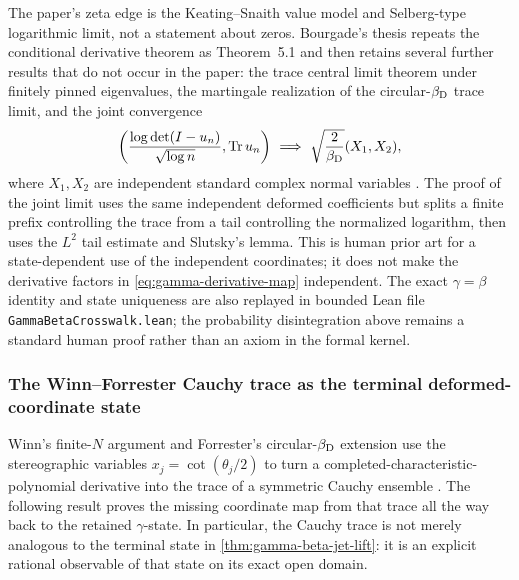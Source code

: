 \begin{sloppypar}
The paper's zeta edge is the Keating--Snaith value model and Selberg-type logarithmic
limit, not a statement about zeros.  Bourgade's thesis repeats the conditional derivative
theorem as Theorem~5.1 and then retains several further results that do not occur in the
paper: the trace central limit theorem under finitely pinned eigenvalues, the martingale
realization of the circular-$\beta_{\rm D}$ trace limit, and the joint convergence
\begin{equation}
 \left(\frac{\log\det(I-u_n)}{\sqrt{\log n}},\operatorname{Tr}u_n\right)
 \ \Longrightarrow\
 \sqrt{\frac{2}{\beta_{\rm D}}}(X_1,X_2),
 \label{eq:bourgade-thesis-logdet-trace}
\end{equation}
where $X_1,X_2$ are independent standard complex normal variables
\cite[Chap.~5, Thms.~5.1, 5.11, 5.14 and Cor.~5.13]{bourgadeThesis2010}.
The proof of the joint limit uses the same independent deformed coefficients but splits a
finite prefix controlling the trace from a tail controlling the normalized logarithm, then
uses the $L^2$ tail estimate and Slutsky's lemma.  This is human prior art for a
state-dependent use of the independent coordinates; it does not make the derivative factors
in \eqref{eq:gamma-derivative-map} independent.  The exact $\gamma=\beta$ identity and state
uniqueness are also replayed in bounded Lean file
\texttt{GammaBetaCrosswalk.lean}; the probability disintegration above remains a standard
human proof rather than an axiom in the formal kernel.
\end{sloppypar}

\subsubsection{The Winn--Forrester Cauchy trace as the terminal deformed-coordinate state}

Winn's finite-$N$ argument and Forrester's circular-$\beta_{\rm D}$ extension use the
stereographic variables $x_j=\cot(\theta_j/2)$ to turn a completed-characteristic-
polynomial derivative into the trace of a symmetric Cauchy ensemble
\cite[\S3.2]{winn2012}\cite[Prop.~2.1]{forrester2022}.  The following result proves the
missing coordinate map from that trace all the way back to the retained
$\gamma$-state.  In particular, the Cauchy trace is not merely analogous to the terminal
state in \cref{thm:gamma-beta-jet-lift}: it is an explicit rational observable of that
state on its exact open domain.


